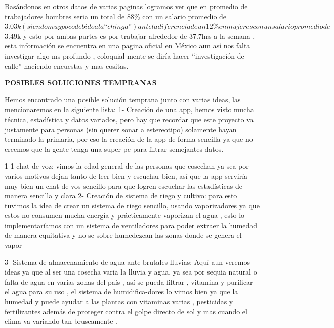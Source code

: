 \documentclass[12pt]{article}
\begin{document}
{{{{{{{{			Basándonos en otros datos de varias paginas logramos ver que en promedio de trabajadores hombres seria un total de 88\% con un salario promedio de $3.03k(siendo muy poco debido a la “chinga”) ante la diferencia de un 12\% en mujeres con un salario promedio de $3.49k  y esto por ambas partes es por trabajar alrededor de 37.7hrs a la semana , esta información se encuentra en una pagina oficial en México  aun así nos falta investigar algo ms profundo , coloquial mente se diría hacer “investigación de calle” haciendo encuestas y mas cositas.
			
			\newpage
			\begin{center}
				{\huge \textbf{POSIBLES SOLUCIONES TEMPRANAS}}
			\end{center}
			\vspace{1cm} 
			{\large %
			Hemos encontrado una posible solución temprana junto con varias ideas, las mencionaremos en la siguiente lista:
			1-	Creación de una app, hemos visto mucha técnica, estadística y datos variados, pero hay que recordar que este proyecto va justamente para personas (sin querer sonar a estereotipo) solamente hayan terminado la primaria, por eso la creación de la app de forma sencilla ya que no creemos que la gente tenga una super pc para filtrar semejantes datos.
			
			1-1	chat de voz: vimos la edad general de las personas que cosechan ya sea por varios motivos dejan tanto de leer bien y escuchar bien, así que la app serviría muy bien un chat de vos sencillo para que logren escuchar las estadísticas de manera sencilla y clara 
			2-	Creación de sistema de riego y cultivo: para esto tuvimos la idea de crear un sistema de riego sencillo, usando vaporizadores ya que estos no consumen mucha energía y prácticamente vaporizan el agua , esto lo implementaríamos con un sistema de ventiladores para poder extraer la humedad de manera equitativa y no se sobre humedezcan las zonas donde se genera el vapor
			
			
			3-	Sistema de almacenamiento de agua ante brutales lluvias:
			Aquí aun veremos ideas ya que al ser una cosecha varia la lluvia y agua, ya sea por sequia natural o falta de agua en varias zonas del país , así se pueda filtrar , vitamina y purificar el agua para su uso , el sistema de humidifica-dores lo vimos bien ya que la humedad y puede ayudar a las plantas con vitaminas varias , pesticidas y fertilizantes además de proteger contra el golpe directo de sol y mas cuando el clima va variando tan bruscamente .
			
}}}}}}}}}
\end{document}
